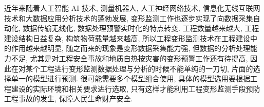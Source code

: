 近年来随着人工智能 AI 技术, 测量机器人, 人工神经网络技术, 信息化无线互联网技术和大数据应用分析技术的蓬勃发展, 变形监测工作也逐步实现了向数据采集自动化, 数据传输无线化, 数据处理预警实时化的特点转变. 工程数量越来越大, 工程建设结构日益复杂, 构筑物荷载量越来越高, 所以工程变形监测技术在工程建设中的作用越来越明显, 随之而来的现象是变形数据采集能力强, 但数据的分析处理能力不足, 尤其是对工程安全事故和地质自热按灾害的变形预警工作还有待提高, 因此在对某个工程进行变形监测数据处理与分析的时候不能单纯的一刀切, 片面的选择单一的模型进行预测. 很可能需要多个模型组合使用, 具体的模型选用要根据工程建设的实际环境和相关要求进行选取, 只有这样才能利用工程变形监测手段预防工程事故的发生, 保障人民生命财产安全. 


